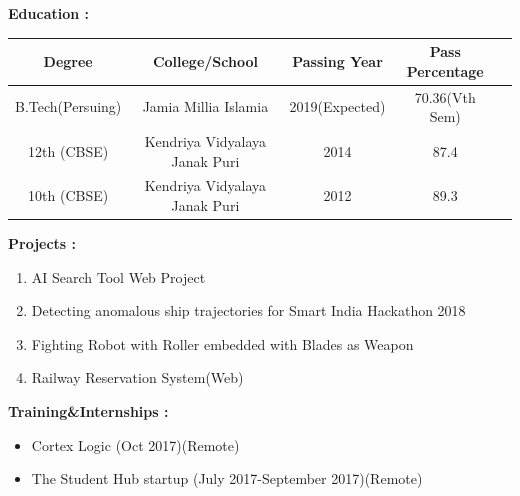 \documentclass[11pt,a4paper]{article}
\begin{document}
\hfill
\begin{multicols}{2}
	\begin{minipage}{0.15\paperwidth}
		\textbf{Education : }
	\end{minipage}
	\begin{minipage}{0.7\paperwidth}
		\renewcommand{\arraystretch}{2}
		\begin{tabular}{|c|c|c|c|c|}
			\hline
			Degree&College\//School&Passing Year&Pass Percentage\\
			\hline
			B.Tech(Persuing)&Jamia Millia Islamia&2019(Expected)&70.36(Vth Sem)\\
			\hline
			12th (CBSE)&Kendriya Vidyalaya Janak Puri&2014&87.4\\
			\hline
			10th (CBSE)&Kendriya Vidyalaya Janak Puri&2012&89.3\\
			\hline
		\end{tabular}
	\end{minipage}
\end{multicols}
\hfill
\begin{multicols}{2}
	\begin{minipage}{0.15\paperwidth}
		\textbf{Projects :}
	\end{minipage}
	\begin{minipage}{0.7\paperwidth}
		\begin{enumerate}
			\item AI Search Tool Web Project 
			\item Detecting anomalous ship trajectories for Smart India Hackathon 2018
			\item Fighting Robot with Roller embedded with Blades as Weapon
			\item Railway Reservation System(Web)
		\end{enumerate}
	\end{minipage}
\end{multicols}
\hfill
\begin{multicols}{2}
	\begin{minipage}{0.16\paperwidth}
		\textbf{Training\&\linebreak Internships :}
	\end{minipage}
	\begin{minipage}{0.7\paperwidth}
		\begin{itemize}
			\item Cortex Logic (Oct 2017)(Remote)
			\item The Student Hub startup (July 2017-September 2017)(Remote)
		\end{itemize}
	\end{minipage}
\end{multicols}
\end{document}
